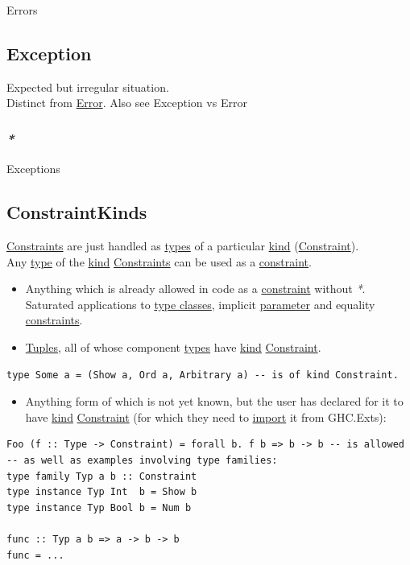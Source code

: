 \documentclass[11pt]{article}
\begin{document}
\label{org544dbf6}Errors\\

\subsection{\label{org39ea709}Exception}
\label{sec:orgc1341ec}
Expected but irregular situation.\\

Distinct from \hyperref[org2b27c5e]{Error}. Also see \label{org0082aa6}Exception vs Error\\

\subsubsection{\emph{*}}
\label{sec:orgdbac1a7}

\label{orga46d1dd}Exceptions\\

\subsection{\label{org399f0c1}ConstraintKinds}
\label{sec:orgc7fc6da}
\hyperref[orgcddf7a9]{Constraints} are just handled as \hyperref[org4209edd]{types} of a particular \hyperref[orgd0eb143]{kind} (\hyperref[org180980d]{Constraint}).\\
Any \hyperref[orgc4aea2f]{type} of the \hyperref[orgd0eb143]{kind} \hyperref[orgcddf7a9]{Constraints} can be used as a \hyperref[org180980d]{constraint}.\\
\begin{itemize}
\item Anything which is already allowed in code as a \hyperref[org180980d]{constraint} without \emph{*}. Saturated applications to \hyperref[orgead20df]{type classes}, implicit \hyperref[org0e7674e]{parameter} and equality \hyperref[orgcddf7a9]{constraints}.\\
\item \hyperref[orga3dc9be]{Tuples}, all of whose component \hyperref[org4209edd]{types} have \hyperref[orgd0eb143]{kind} \hyperref[org180980d]{Constraint}.\\
\end{itemize}
\begin{verbatim}
type Some a = (Show a, Ord a, Arbitrary a) -- is of kind Constraint.
\end{verbatim}
\begin{itemize}
\item Anything form of which is not yet known, but the user has declared for it to have \hyperref[orgd0eb143]{kind} \hyperref[org180980d]{Constraint} (for which they need to \hyperref[orge7bdadf]{import} it from GHC.Exts):\\
\end{itemize}
\begin{verbatim}
Foo (f :: Type -> Constraint) = forall b. f b => b -> b -- is allowed
-- as well as examples involving type families:
type family Typ a b :: Constraint
type instance Typ Int  b = Show b
type instance Typ Bool b = Num b

func :: Typ a b => a -> b -> b
func = ...
\end{verbatim}
\end{document}
